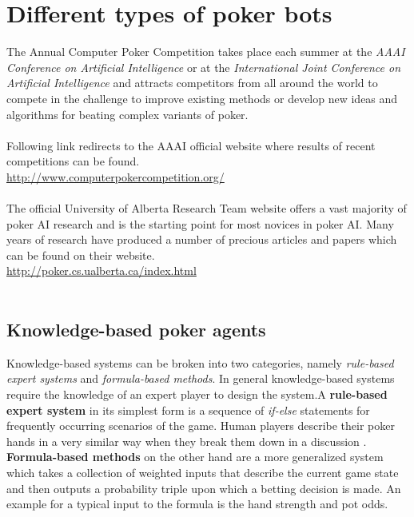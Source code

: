 \section{Different types of poker bots}
The Annual Computer Poker Competition takes place each summer at the \textit{AAAI Conference on Artificial Intelligence} or at the \textit{International Joint Conference on Artificial Intelligence} and attracts competitors from all around the world to compete in the challenge to improve existing methods or develop new ideas and algorithms for beating complex variants of poker. \cite{acpc} \\\\
Following link redirects to the AAAI official website where results of recent competitions can be found.\\
\url{http://www.computerpokercompetition.org/}\\\\
The official University of Alberta Research Team website offers a vast majority of poker AI research and is the starting point for most novices in poker AI. Many years of research have produced a number of precious articles and papers which can be found on their website.\\
\url{http://poker.cs.ualberta.ca/index.html}\\\\

\subsection{Knowledge-based poker agents}
Knowledge-based systems can be broken into two categories, namely \textit{rule-based expert systems} and \textit{formula-based methods}. In general knowledge-based systems require the knowledge of an expert player to design the system\cite{review}.A \textbf{rule-based expert system} in its simplest form is a sequence of \textit{if-else} statements for frequently occurring scenarios of the game. Human players describe their poker hands in a very similar way when they break them down in a discussion \cite{master_nuno}. \textbf{Formula-based methods} on the other hand are a more generalized system which takes a collection of weighted inputs that describe the current game state and then outputs a probability triple upon which a betting decision is made. An example for a typical input to the formula is the hand strength and pot odds. 
